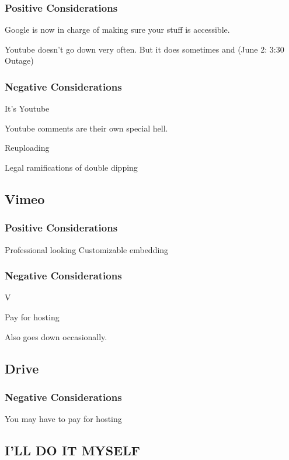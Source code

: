 \documentclass[sigconf]{acmart}
\begin{document}
\subsubsection{Positive Considerations}
Google is now in charge of making sure your stuff is accessible.


Youtube doesn't go down very often.  But it does sometimes \cite{outage2018} and (June 2: 3:30 Outage) \cite{outage2019}

\subsubsection{Negative Considerations}

It's Youtube

Youtube comments are their own special hell.


Reuploading

Legal ramifications of double dipping


\subsection{Vimeo}

\subsubsection{Positive Considerations}
Professional looking
Customizable embedding

\subsubsection{Negative Considerations}
V

Pay for hosting

Also goes down occasionally.

\subsection{Drive}



\subsubsection{Negative Considerations}
You may have to pay for hosting


\subsection{I'LL DO IT MYSELF}
\end{document}
